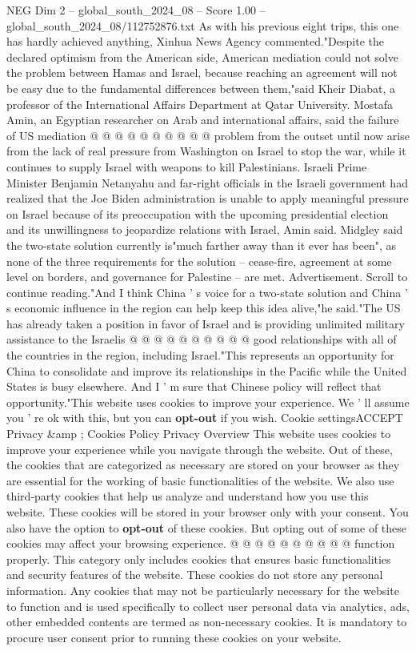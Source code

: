 \begin{textsample}{NEG Dim 2 – global\_south\_2024\_08 – Score 1.00 – global\_south\_2024\_08/112752876.txt}
As with his previous eight trips, this one has hardly achieved anything, Xinhua News Agency commented."Despite the declared optimism from the American side, American mediation could not solve the problem between Hamas and Israel, because reaching an agreement will not be easy due to the fundamental differences between them,"said Kheir Diabat, a professor of the International Affairs Department at Qatar University.
Mostafa Amin, an Egyptian researcher on Arab and international affairs, said the failure of US mediation @ @ @ @ @ @ @ @ @ @ problem from the outset until now arise from the lack of real pressure from Washington on Israel to stop the war, while it continues to supply Israel with weapons to kill Palestinians.
Israeli Prime Minister Benjamin Netanyahu and far-right officials in the Israeli government had realized that the Joe Biden administration is unable to apply meaningful pressure on Israel because of its preoccupation with the upcoming presidential election and its unwillingness to jeopardize relations with Israel, Amin said.
Midgley said the two-state solution currently is"much farther away than it ever has been", as none of the three requirements for the solution -- cease-fire, agreement at some level on borders, and governance for Palestine -- are met.
Advertisement.
Scroll to continue reading."And I think China ' s voice for a two-state solution and China ' s economic influence in the region can help keep this idea alive,"he said."The US has already taken a position in favor of Israel and is providing unlimited military assistance to the Israelis @ @ @ @ @ @ @ @ @ @ good relationships with all of the countries in the region, including Israel."This represents an opportunity for China to consolidate and improve its relationships in the Pacific while the United States is busy elsewhere.
And I ' m sure that Chinese policy will reflect that opportunity."This website uses cookies to improve your experience.
We ' ll assume you ' re ok with this, but you can \textbf{opt-out} if you wish.
Cookie settingsACCEPT Privacy \&amp ; Cookies Policy Privacy Overview This website uses cookies to improve your experience while you navigate through the website.
Out of these, the cookies that are categorized as necessary are stored on your browser as they are essential for the working of basic functionalities of the website.
We also use third-party cookies that help us analyze and understand how you use this website.
These cookies will be stored in your browser only with your consent.
You also have the option to \textbf{opt-out} of these cookies.
But opting out of some of these cookies may affect your browsing experience. @ @ @ @ @ @ @ @ @ @ function properly.
This category only includes cookies that ensures basic functionalities and security features of the website.
These cookies do not store any personal information.
Any cookies that may not be particularly necessary for the website to function and is used specifically to collect user personal data via analytics, ads, other embedded contents are termed as non-necessary cookies.
It is mandatory to procure user consent prior to running these cookies on your website.

\end{textsample}
